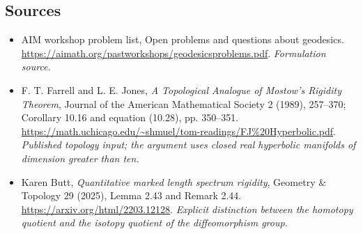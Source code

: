 \documentclass[11pt]{article}
\begin{document}
\subsection{Sources}
\begin{itemize}
\item[S1]AIM workshop problem list, Open problems and questions about geodesics.
\url{https://aimath.org/pastworkshops/geodesicsproblems.pdf}.
\textit{Formulation source.}
\item[E1]F. T. Farrell and L. E. Jones, \emph{A Topological Analogue of Mostow's Rigidity Theorem}, Journal of the American Mathematical Society 2 (1989), 257--370; Corollary 10.16 and equation (10.28), pp. 350--351.
\url{https://math.uchicago.edu/~shmuel/tom-readings/FJ%20Hyperbolic.pdf}.
\textit{Published topology input; the argument uses closed real hyperbolic manifolds of dimension greater than ten.}
\item[E2]Karen Butt, \emph{Quantitative marked length spectrum rigidity}, Geometry \& Topology 29 (2025), Lemma 2.43 and Remark 2.44.
\url{https://arxiv.org/html/2203.12128}.
\textit{Explicit distinction between the homotopy quotient and the isotopy quotient of the diffeomorphism group.}
\end{itemize}
\end{document}
